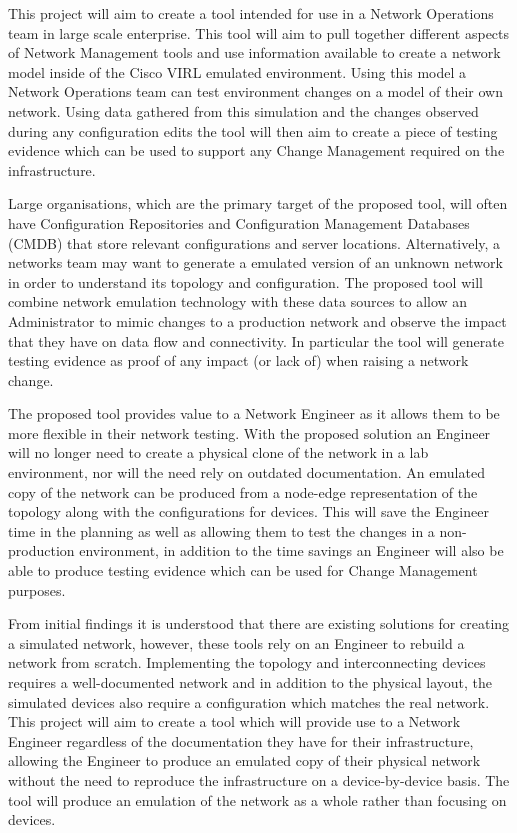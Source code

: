 \documentclass[11pt]{report}
\begin{document}
This project will aim to create a tool intended for use in a Network Operations team in large scale enterprise. This tool will aim to pull together different aspects of Network Management tools and use information available to create a network model inside of the Cisco VIRL emulated environment. Using this model a Network Operations team can test environment changes on a model of their own network. Using data gathered from this simulation and the changes observed during any configuration edits the tool will then aim to create a piece of testing evidence which can be used to support any Change Management required on the infrastructure.

Large organisations, which are the primary target of the proposed tool, will often have Configuration Repositories and Configuration Management Databases (CMDB) that store relevant configurations and server locations. Alternatively, a networks team may want to generate a emulated version of an unknown network in order to understand its topology and configuration. The proposed tool will combine network emulation technology with these data sources to allow an Administrator to mimic changes to a production network and observe the impact that they have on data flow and connectivity. In particular the tool will generate testing evidence as proof of any impact (or lack of) when raising a network change.

The proposed tool provides value to a Network Engineer as it allows them to be more flexible in their network testing. With the proposed solution an Engineer will no longer need to create a physical clone of the network in a lab environment, nor will the need rely on outdated documentation. An emulated copy of the network can be produced from a node-edge representation of the topology along with the configurations for devices. This will save the Engineer time in the planning as well as allowing them to test the changes in a non-production environment, in addition to the time savings an Engineer will also be able to produce testing evidence which can be used for Change Management purposes.

From initial findings it is understood that there are existing solutions for creating a simulated network, however, these tools rely on an Engineer to rebuild a network from scratch. Implementing the topology and interconnecting devices requires a well-documented network and in addition to the physical layout, the simulated devices also require a configuration which matches the real network. This project will aim to create a tool which will provide use to a Network Engineer regardless of the documentation they have for their infrastructure, allowing the Engineer to produce an emulated copy of their physical network without the need to reproduce the infrastructure on a device-by-device basis. The tool will produce an emulation of the network as a whole rather than focusing on devices.
\end{document}

